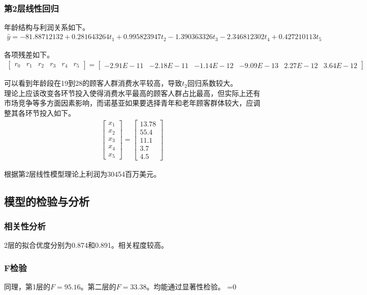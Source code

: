 \documentclass{article}
\begin{document}
\subsubsection{第2层线性回归}
年龄结构与利润关系如下。
\begin{align}
	\hat{y}=-81.88712132+0.281643264t_1+0.995823947t_2-1.390363326t_3-2.346812302t_4+0.427210113t_5
\end{align}
\par\indent 各项残差如下。
\begin{align}
	\begin{bmatrix}
		r_0 & r_1 & r_2 & r_3 & r_4 & r_5
	\end{bmatrix}
	=
	\begin{bmatrix}
		-2.91E-11 &	-2.18E-11 &	-1.14E-12 &	-9.09E-13 & 2.27E-12 & 3.64E-12
	\end{bmatrix}
\end{align}
\par\indent 可以看到年龄段在19到28的顾客人群消费水平较高，导致\(t_2\)回归系数较大。
\\\indent 理论上应该改变各环节投入使得消费水平最高的顾客人群占比最高，但实际上还有市场竞争等多方面因素影响，而诺基亚如果要选择青年和老年顾客群体较大，应调整其各环节投入如下。
\begin{align}
	\begin{bmatrix}
		x_1\\
		x_2\\
		x_3\\
		x_4\\
		x_5
	\end{bmatrix}
	=
	\begin{bmatrix}
		13.78\\
		55.4\\
		11.1\\
		3.7\\
		4.5
	\end{bmatrix}
\end{align}
\par\indent 根据第2层线性模型理论上利润为30454百万美元。
\subsection{模型的检验与分析}
\subsubsection{相关性分析}
2层的拟合优度分别为0.874和0.891。相关程度较高。
\subsubsection{F检验}
同理，第1层的\(F=95.16\)。第二层的\(F=33.38\)。均能通过显著性检验。
\ifnum{}=0
	
\end{document}
